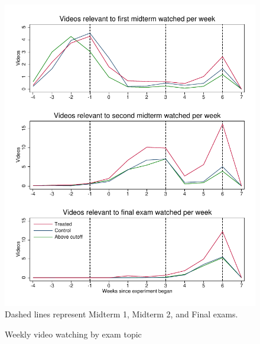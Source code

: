 \documentclass[12pt]{article}
\begin{document}
\clearpage
\begin{figure}[t]
\begin{center}
\caption{Weekly video watching by exam topic}
\label{timeseries_by_exam} %
\includegraphics[width=1\textwidth, angle=0]{../plots/tscombo_exam}
\footnotesize Dashed lines represent Midterm 1, Midterm 2, and Final exams.
\end{center}
\end{figure}

\end{document}
